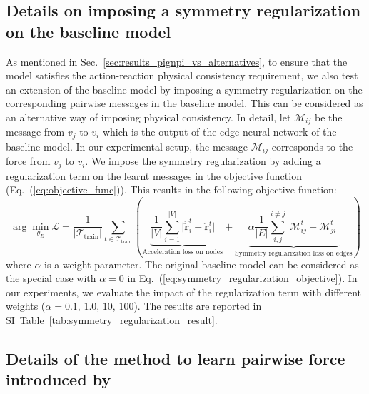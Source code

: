 \documentclass{article}
\newcommand{\abs}[1]{\lvert #1 \rvert}
\newcommand{\APPENDIX}{SI} %
\begin{document}
\subsection{Details on imposing a symmetry regularization on the baseline model}
\label{sec:method_symmetry_regularization}
As mentioned in Sec.~\ref{sec:results_pignpi_vs_alternatives}, to ensure that the model satisfies the action-reaction physical consistency requirement, we also test an extension of the baseline model by imposing a symmetry regularization on the corresponding pairwise messages in the baseline model. This can be considered as an alternative way of imposing physical consistency. In detail, let $\mathcal{M}_{ij}$ be the message from $v_{j}$ to $v_{i}$ which is the output of the edge neural network of the baseline model. In our experimental setup, the message $\mathcal{M}_{ij}$ corresponds to the force from $v_{j}$ to $v_{i}$. We impose the symmetry regularization by adding a regularization term on the learnt messages in the objective function (Eq.~(\ref{eq:objective_func})). This results in the following objective function:
\begin{equation}
    \arg\min_{\theta_{E}} \mathcal{L} = \frac{1}{|\mathcal{T}_{\text{train}}|} \sum_{t \in \mathcal{T}_{\text{train}}} \left (\underbrace{\frac{1}{|V|}\sum_{i=1}^{|V|} \abs{\bm{\hat{\ddot{r}}}_i^t - \bm{\ddot{r}}_i^t}}_{\text{Acceleration loss on nodes}} + \underbrace{\alpha \frac{1}{|E|}\sum_{i,j}^{i\neq j}\abs{\mathcal{M}_{ij}^t + \mathcal{M}_{ji}^t}}_{\text{Symmetry regularization loss on edges}} \right )
    \label{eq:symmetry_regularization_objective}
\end{equation}
where $\alpha$ is a weight parameter. The original baseline model can be considered as the special case with $\alpha=0$ in Eq.~(\ref{eq:symmetry_regularization_objective}). In our experiments, we evaluate the impact of the regularization term with different weights  ($\alpha=0.1$, $1.0$, $10$, $100$). The results are reported in \APPENDIX~Table~\ref{tab:symmetry_regularization_result}.

\subsection{Details of the method to learn pairwise force introduced by \cite{lemos2021rediscovering}}
\label{sec:method_lemos2021rediscovering}
\end{document}
